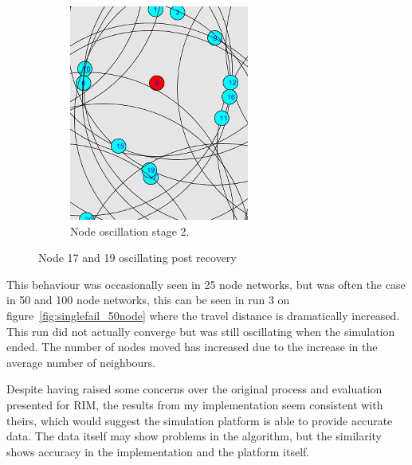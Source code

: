 \documentclass[authoryearcitations]{UoYCSproject}
\begin{document}
\begin{figure}
\begin{subfigure}[t]{.48\textwidth}
        \includegraphics[width=\textwidth]{figures/singlenodeOscil2.png}
        \caption{Node oscillation stage 2.}
        \label{fig:singlenodeOscil2}
    \end{subfigure}
 \caption{Node 17 and 19 oscillating post recovery}
 \label{fig:singlenodeOscil}
\end{figure}

This behaviour was occasionally seen in 25 node networks, but was often the case in 50 and 100 node networks, this can be seen in run 3 on figure~\ref{fig:singlefail_50node} where the travel distance is dramatically increased. This run did not actually converge but was still oscillating when the simulation ended. The number of nodes moved has increased due to the increase in the average number of neighbours.

Despite having raised some concerns over the original process and evaluation presented for RIM, the results from my implementation seem consistent with theirs, which would suggest the simulation platform is able to provide accurate data. The data itself may show problems in the algorithm, but the similarity shows accuracy in the implementation and the platform itself.
\end{document}
